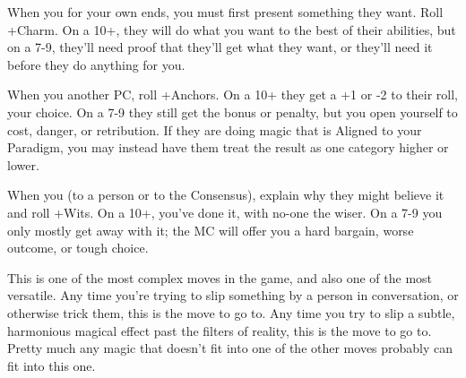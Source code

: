 \begin{multicols}{3}
  \SEPARATOR

  \begin{move}
    When you  for your own ends, you must first
    present something they want. Roll +Charm. On a 10+, they will do
    what you want to the best of their abilities, but on a 7-9,
    they'll need proof that they'll get what they want, or they'll
    need it before they do anything for you.
  \end{move}

  \SEPARATOR

  \begin{move}
    When you  another PC, roll +Anchors. On a
    10+ they get a +1 or -2 to their roll, your choice. On a 7-9 they
    still get the bonus or penalty, but you open yourself to cost,
    danger, or retribution. If they are doing magic that is Aligned to
    your Paradigm, you may instead have them treat the result as one
    category higher or lower.
  \end{move}

  \columnbreak
    
  \begin{move}
    When you  (to a person or to the Consensus),
    explain why they might believe it and roll +Wits. On a 10+, you've
    done it, with no-one the wiser. On a 7-9 you only mostly get away
    with it; the MC will offer you a hard bargain, worse outcome, or
    tough choice.
\begin{movedetail}
  This is one of the most complex moves in the game, and also one of
  the most versatile. Any time you're trying to slip something by a
  person in conversation, or otherwise trick them, this is the move to
  go to. Any time you try to slip a subtle, harmonious magical
  effect past the filters of reality, this is the move to go
  to. Pretty much any magic that doesn't fit into one of the other
  moves probably can fit into this one.
\end{movedetail}
  \end{move}

  \vspace{1em}
  
  \SEPARATOR


\end{multicols}
